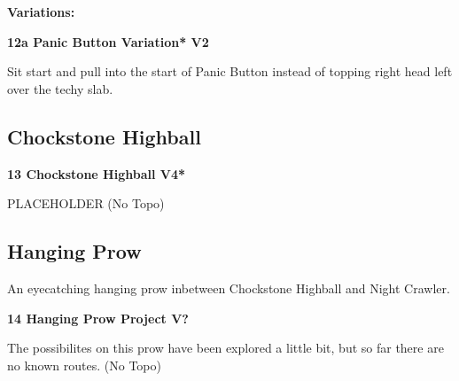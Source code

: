 \begin{multicols}{2}
				\begin{adjustwidth}{0.5cm}{}				
				\needspace{3cm}
				\textbf{Variations:} \newline
					
					\needspace{1.5cm}
\label{vr:Panic Button Variation}
\colorbox{green!20}{
\parbox{0.95\linewidth}{
\textbf{
12a Panic Button Variation* V2  
}}}

					\begin{adjustwidth}{0.5cm}{}			
					Sit start and pull into the start of Panic Button instead of topping right head left over the techy slab.
					\end{adjustwidth}
					
					
				\end{adjustwidth}
			
		
		
		\needspace{1.5cm}
		\subsection*{Chockstone Highball}\label{bf:Chockstone Highball}
			
		
			
			\needspace{1.5cm}
\label{rt:Chockstone Highball}
\colorbox{RoyalBlue!20}{
\parbox{0.95\linewidth}{
\textbf{
13 Chockstone Highball V4*  
}}}

			\begin{adjustwidth}{0.5cm}{}			
			PLACEHOLDER (No Topo)
			\end{adjustwidth}
			
			
		
		
		\needspace{1.5cm}
		\subsection*{Hanging Prow}\label{bf:Hanging Prow}
		An eyecatching hanging prow inbetween Chockstone Highball and Night Crawler.\\
	
		
			
			\needspace{1.5cm}
\label{rt:Hanging Prow Project}
\colorbox{black!20}{
\parbox{0.95\linewidth}{
\textbf{
14 Hanging Prow Project V?  
}}}

			\begin{adjustwidth}{0.5cm}{}			
			The possibilites on this prow have been explored a little bit, but so far there are no known routes. (No Topo)
			\end{adjustwidth}
			
			
		

\end{multicols}
